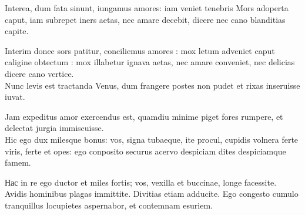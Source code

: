 {\large
\noindent Interea, dum fata sinunt, iungamus amores: iam veniet tenebris Mors adoperta caput, iam subrepet iners aetas, nec amare decebit, dicere nec cano blanditias capite.\\

}

\noindent Interim donec sors patitur, conciliemus amores : mox letum adveniet caput caligine obtectum : mox illabetur ignava aetas, nec amare conveniet, nec delicias dicere cano vertice. \\

{\large
\noindent Nunc levis est tractanda Venus, dum frangere postes non pudet et rixas inseruisse iuvat.\\

}

\noindent Jam expeditus amor exercendus est, quamdiu minime piget fores rumpere, et delectat jurgia immiscuisse. \\

{\large
\noindent Hic ego dux milesque bonus: vos, signa tubaeque, ite procul, cupidis volnera ferte viris, ferte et opes: ego conposito securus acervo despiciam dites despiciamque famem. \\

}

\noindent Нас in re ego ductor et miles fortis; vos, vexilla et buccinae, longe facessite. Avidis hominibus plagas immittite. Divitias etiam adducite. Ego congesto cumulo tranquillus locupietes aspernabor, et contemnam esuriem.


